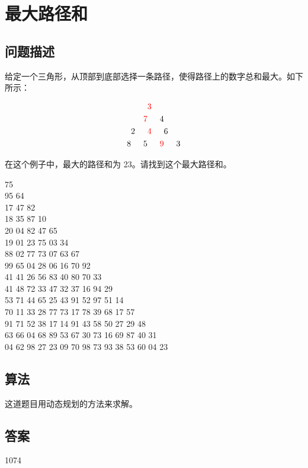 \section{最大路径和}
\subsection{问题描述}
\begin{tcolorbox}
	给定一个三角形，从顶部到底部选择一条路径，使得路径上的数字总和最大。如下所示：

	\[
		\begin{aligned}
			  &   &                    & \textcolor{red}{3} &                    &   &   \\
			  &   & \textcolor{red}{7} &                    & 4                  &   &   \\
			  & 2 &                    & \textcolor{red}{4} &                    & 6 &   \\
			8 &   & 5                  &                    & \textcolor{red}{9} &   & 3
		\end{aligned}
	\]

	在这个例子中，最大的路径和为 23。请找到这个最大路径和。

	\begin{center}
		75\\
		95 64\\
		17 47 82\\
		18 35 87 10\\
		20 04 82 47 65\\
		19 01 23 75 03 34\\
		88 02 77 73 07 63 67\\
		99 65 04 28 06 16 70 92\\
		41 41 26 56 83 40 80 70 33\\
		41 48 72 33 47 32 37 16 94 29\\
		53 71 44 65 25 43 91 52 97 51 14\\
		70 11 33 28 77 73 17 78 39 68 17 57\\
		91 71 52 38 17 14 91 43 58 50 27 29 48\\
		63 66 04 68 89 53 67 30 73 16 69 87 40 31\\
		04 62 98 27 23 09 70 98 73 93 38 53 60 04 23\\
	\end{center}
\end{tcolorbox}

\subsection{算法}
这道题目用动态规划的方法来求解。

\subsection{答案}
1074
